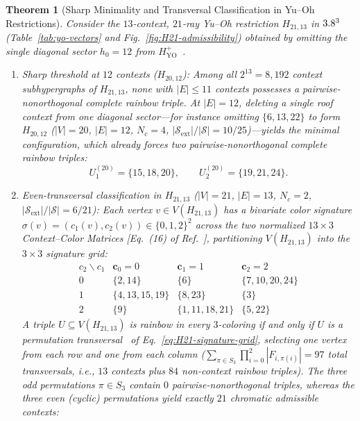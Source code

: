 \documentclass[aps,pra,reprint,superscriptaddress,longbibliography,nofootinbib,floatfix,10pt]{revtex4-2}
\newtheorem{theorem}{Theorem}
\theoremstyle{definition}\newtheorem{definition}[theorem]{Definition}
\theoremstyle{remark}\newtheorem{remark}[theorem]{Remark}
\newcommand{\Sc}{\mathcal S}\newcommand{\Cc}{\mathcal C}\newcommand{\Wc}{\mathcal W}
\newcommand{\YO}{\mathrm{YO}}\newcommand{\ip}[2]{\langle #1,#2\rangle}
\begin{document}
\begin{theorem}[Sharp Minimality and Transversal Classification in Yu--Oh Restrictions]\label{thm:H21-complete}
Consider the $13$-context, $21$-ray Yu--Oh restriction $H_{21,13}$ in $3.8^3$ (Table~\ref{tab:yo-vectors} and Fig.~\ref{fig:H21-admissibility}) obtained by omitting the single diagonal sector $h_0=12$ from $H_{\YO}^+$~\cite{svozil-2026-chromaticcoordinatization,2026-latin-context-matrix}.
\begin{enumerate}
\item \emph{Sharp threshold at $12$ contexts ($H_{20,12}$):} Among all $2^{13}=8{,}192$ context subhypergraphs of $H_{21,13}$, none with $|E|\le 11$ contexts possesses a pairwise-nonorthogonal complete rainbow triple. At $|E|=12$, deleting a single roof context from one diagonal sector---for instance omitting $\{6,13,22\}$ to form $H_{20,12}$ ($|V|=20$, $|E|=12$, $N_c=4$, $|\Sc_{\mathrm{ext}}|/|\Sc|=10/25$)---yields the minimal configuration, which already forces two pairwise-nonorthogonal complete rainbow triples:
\begin{equation}\label{eq:H20-triples}
U_1^{(20)}=\{15,18,20\},\qquad U_2^{(20)}=\{19,21,24\}.
\end{equation}
\item \emph{Even-transversal classification in $H_{21,13}$ ($|V|=21$, $|E|=13$, $N_c=2$, $|\Sc_{\mathrm{ext}}|/|\Sc|=6/21$):} Each vertex $v\in V(H_{21,13})$ has a bivariate color signature $\sigma(v)=(c_1(v),c_2(v))\in\{0,1,2\}^2$ across the two normalized $13\times 3$ Context--Color Matrices [Eq.~(16) of Ref.~\cite{2026-latin-context-matrix}], partitioning $V(H_{21,13})$ into the $3\times 3$ signature grid:
\begin{equation}\label{eq:H21-signature-grid}
\begin{array}{c|ccc}
c_2\backslash c_1 & \mathbf{c}_0=0 & \mathbf{c}_1=1 & \mathbf{c}_2=2\\\hline
0 & \{2,14\} & \{6\} & \{7,10,20,24\}\\
1 & \{4,13,15,19\} & \{8,23\} & \{3\}\\
2 & \{9\} & \{1,11,18,21\} & \{5,22\}
\end{array}
\end{equation}
A triple $U\subseteq V(H_{21,13})$ is rainbow in every $3$-coloring if and only if $U$ is a \emph{permutation transversal}~\cite{wanless2011transversals} of Eq.~\eqref{eq:H21-signature-grid}, selecting one vertex from each row and one from each column ($\sum_{\pi\in S_3}\prod_{i=0}^2 |F_{i,\pi(i)}|=97$ total transversals, i.e., $13$ contexts plus $84$ non-context rainbow triples). The three odd permutations $\pi\in S_3$ contain $0$ pairwise-nonorthogonal triples, whereas the three even (cyclic) permutations yield \emph{exactly $21$ chromatic admissible contexts}:

\end{enumerate}
\end{theorem}
\end{document}

